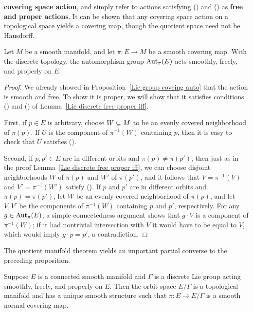 \textbf{covering space action}, and simply refer to actions satisfying 
() and () as \textbf{free and proper actions}. It can 
be shown that any covering space action on a topological space yields a covering 
map, though the quotient space need not be Hausdorff.
\begin{proposition}\label{Lie group coveing group discrete}
Let $M$ be a smooth manifold, and let $\pi:E\to M$ be a smooth covering map. With 
the discrete topology, the automorphism group $\mathrm{Aut}_\pi(E)$ acts smoothly, 
freely, and properly on $E$.
\end{proposition}
\begin{proof}
We already showed in Proposition~\ref{Lie group coveing auto} that the action is smooth and free. To show it is proper, we will show that it satisfies conditions () and () of Lemma~\ref{Lie discrete free proper iff}.\par
First, if $p\in E$ is arbitrary, choose $W\subseteq M$ to be an evenly covered 
neighborhood of $\pi(p)$. If $U$ is the component of $\pi^{-1}(W)$ containing $p$, then it is easy to check that $U$ satisfies ().\par
Second, if $p,p'\in E$ are in different orbits and $\pi(p)\neq\pi(p')$, then just as in the proof Lemma~\ref{Lie discrete free proper iff}, we can choose disjoint neighborhoods $W$ of $\pi(p)$ and $W'$ of $\pi(p')$, and it follows that $V=\pi^{-1}(V)$ and $V'=\pi^{-1}(W')$ satisfy (). If $p$ and $p'$ are in different orbits and $\pi(p)=\pi(p')$, let $W$ be an evenly covered neighborhood of $\pi(p)$, and let $V,V'$ be the components of $\pi^{-1}(W)$ containing $p$ and $p'$, respectively. For any $g\in\mathrm{Aut}_{\pi}(E)$, a simple connectedness argument shows that $g\cdot V$ is a component of $\pi^{-1}(W)$; if it had nontrivial intersection with $V$ it would have to be equal to $V$, which would imply $g\cdot p=p'$, a contradiction.
\end{proof}
The quotient manifold theorem yields an important partial converse to the preceding proposition.
\begin{proposition}\label{Lie discrete covering map}
Suppose $E$ is a connected smooth manifold and $\Gamma$ is a discrete Lie group acting smoothly, freely, and properly on $E$. Then the orbit space $E/\Gamma$ is a topological manifold and has a unique smooth structure such that $\pi:E\to E/\Gamma$ is a smooth normal covering map.
\end{proposition}
